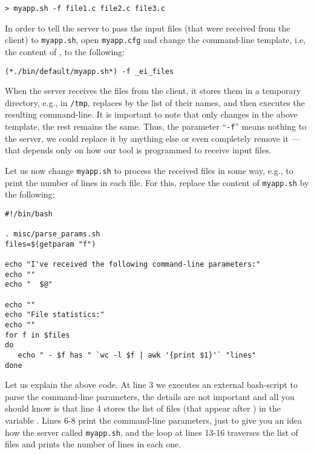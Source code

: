 \medskip
\begin{lstlisting}
> myapp.sh -f file1.c file2.c file3.c
\end{lstlisting}

\medskip 
\noindent
In order to tell the server to pass the input files (that were
received from the client) to \texttt{myapp.sh}, open
\texttt{myapp.cfg} and change the command-line template, i.e, the
content of , to the following:

\medskip
\begin{lstlisting}
(*./bin/default/myapp.sh*) -f _ei_files
\end{lstlisting}

\medskip
\noindent
When the server receives the files from the client, it stores them in
a temporary directory, e.g., in \texttt{/tmp}, replaces 
by the list of their names, and then executes the resulting
command-line.
%
It is important to note that only  changes in the above
template, the rest remains the same. Thus, the parameter
``\texttt{-f}'' means nothing to the server, we could replace it by
anything else or even completely remove it --- that depends only on
how our tool is programmed to receive input files.

Let us now change \texttt{myapp.sh} to process the received files in
some way, e.g., to print the number of lines in each file. For this,
replace the content of \texttt{myapp.sh} by the following:

\medskip
\begin{lstlisting}[style=script]
#!/bin/bash

. misc/parse_params.sh
files=$(getparam "f")

echo "I've received the following command-line parameters:"
echo ""
echo "  $@"

echo ""
echo "File statistics:"
echo ""
for f in $files 
do
   echo " - $f has " `wc -l $f | awk '{print $1}'` "lines"
done
\end{lstlisting}

\medskip
\noindent
Let us explain the above code. 
%
At line 3 we executes an external bash-script to parse the
command-line parameters, the details are not important and all you
should know is that line 4 stores the list of files (that appear after
) in the variable .
%
Lines 6-8 print the command-line parameters, just to give you an idea
how the server called \texttt{myapp.sh}, and the loop at lines 13-16
traverses the list of files and prints the number of lines in each
one.

